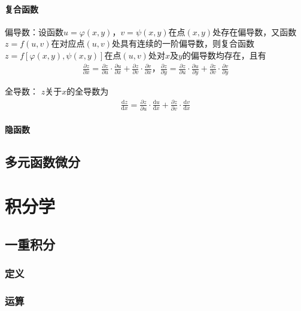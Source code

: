 \documentclass[12pt]{book}
\begin{document}
\subsubsection{复合函数}

偏导数：设函数$ u=\varphi(x,y) $，$ v=\psi (x,y) $在点$ (x,y) $处存在偏导数，又函数$ z=f(u,v) $在对应点$ (u,v) $处具有连续的一阶偏导数，则复合函数$ z=f[\varphi(x,y),\psi(x,y)] $在点$ (u,v) $处对$ x $及$ y $的偏导数均存在，且有
\begin{gather*}
    \frac{\partial z}{\partial x}=\frac{\partial z}{\partial u}\cdot \frac{\partial u}{\partial x}+\frac{\partial z}{\partial v}\cdot \frac{\partial v}{\partial x}，\frac{\partial z}{\partial y}=\frac{\partial z}{\partial u}\cdot \frac{\partial u}{\partial y }+\frac{\partial z}{\partial v}\cdot \frac{\partial v}{\partial y} 
\end{gather*}
 

全导数： $z $关于$ x $的全导数为
\begin{gather*}
    \frac{\mathrm{d}z}{\mathrm{d}x} = \frac{\partial z}{\partial u}\cdot\frac{\mathrm{d}u}{\mathrm{d}x}+ \frac{\partial z}{\partial v}\cdot\frac{\mathrm{d}v}{\mathrm{d}x} 
\end{gather*}
 

\subsubsection{隐函数}



\section{多元函数微分}




\chapter{积分学}




\section{一重积分}


\subsection{定义}


\subsection{运算}
\end{document}
